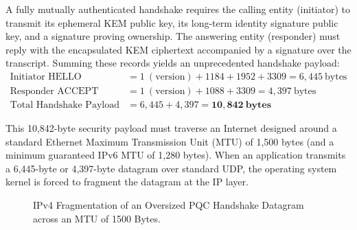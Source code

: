 A fully mutually authenticated handshake requires the calling entity (initiator) to transmit its ephemeral KEM public key, its long-term identity signature public key, and a signature proving ownership. The answering entity (responder) must reply with the encapsulated KEM ciphertext accompanied by a signature over the transcript. Summing these records yields an unprecedented handshake payload:
\begin{align}
    \text{Initiator HELLO} &= 1\ (\text{version}) + 1184 + 1952 + 3309 = 6,445\ \text{bytes} \\
    \text{Responder ACCEPT} &= 1\ (\text{version}) + 1088 + 3309 = 4,397\ \text{bytes} \\
    \text{Total Handshake Payload} &= 6,445 + 4,397 = \mathbf{10,842\ \text{bytes}}
\end{align}

This 10,842-byte security payload must traverse an Internet designed around a standard Ethernet Maximum Transmission Unit (MTU) of 1,500 bytes (and a minimum guaranteed IPv6 MTU of 1,280 bytes). When an application transmits a 6,445-byte or 4,397-byte datagram over standard UDP, the operating system kernel is forced to fragment the datagram at the IP layer.

\begin{figure}[htbp]
    \centering
    \caption{IPv4 Fragmentation of an Oversized PQC Handshake Datagram across an MTU of 1500 Bytes.}
    \label{fig:ip_frag_overview}
\end{figure}

